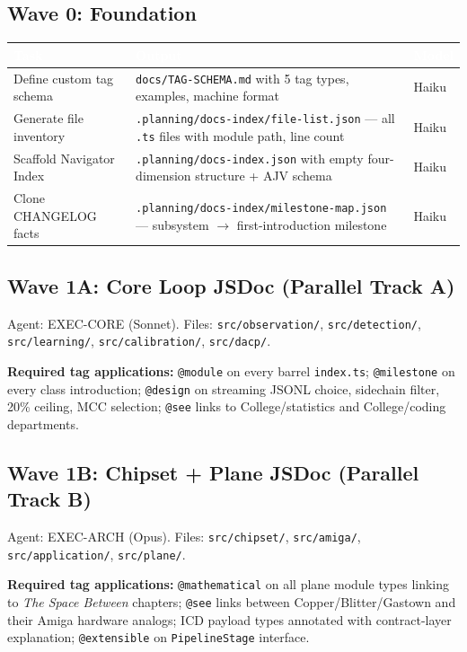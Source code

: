 \documentclass[11pt,letterpaper]{article}
\newcommand{\tableheader}[1]{\textbf{\sffamily\textcolor{white}{#1}}}
\begin{document}
\subsection{Wave 0: Foundation}

\begin{center}
\begin{tabularx}{\textwidth}{L{4cm}XC{1.8cm}}
\toprule
{}
\tableheader{Task} & \tableheader{Output} & \tableheader{Model} \\
\midrule
Define custom tag schema & \texttt{docs/TAG-SCHEMA.md} with 5 tag types, examples, machine format & Haiku \\
Generate file inventory & \texttt{.planning/docs-index/file-list.json} --- all \texttt{.ts} files with module path, line count & Haiku \\
Scaffold Navigator Index & \texttt{.planning/docs-index.json} with empty four-dimension structure + AJV schema & Haiku \\
Clone CHANGELOG facts & \texttt{.planning/docs-index/milestone-map.json} --- subsystem $\to$ first-introduction milestone & Haiku \\
\bottomrule
\end{tabularx}
\end{center}

\subsection{Wave 1A: Core Loop JSDoc (Parallel Track A)}

Agent: EXEC-CORE (Sonnet). Files: \texttt{src/observation/}, \texttt{src/detection/}, \texttt{src/learning/}, \texttt{src/calibration/}, \texttt{src/dacp/}.

\textbf{Required tag applications:} \texttt{@module} on every barrel \texttt{index.ts}; \texttt{@milestone} on every class introduction; \texttt{@design} on streaming JSONL choice, sidechain filter, 20\% ceiling, MCC selection; \texttt{@see} links to College/statistics and College/coding departments.

\subsection{Wave 1B: Chipset + Plane JSDoc (Parallel Track B)}

Agent: EXEC-ARCH (Opus). Files: \texttt{src/chipset/}, \texttt{src/amiga/}, \texttt{src/application/}, \texttt{src/plane/}.

\textbf{Required tag applications:} \texttt{@mathematical} on all plane module types linking to \textit{The Space Between} chapters; \texttt{@see} links between Copper/Blitter/Gastown and their Amiga hardware analogs; ICD payload types annotated with contract-layer explanation; \texttt{@extensible} on \texttt{PipelineStage} interface.
\end{document}
